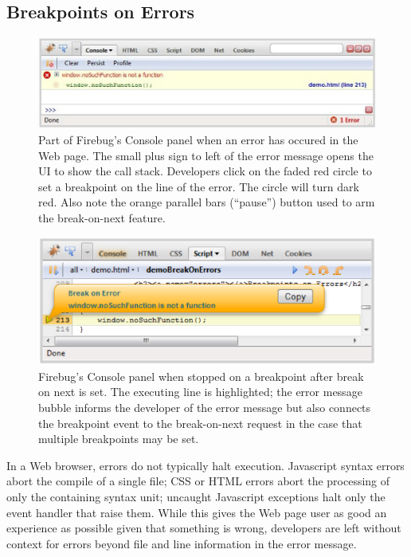 \documentclass{www2010-accepted}
\begin{document}
\subsection{Breakpoints on Errors}
\begin{figure}[htp]
\center
\includegraphics[scale=0.7]{error_in_console_set_break.eps}
\caption{Part of Firebug's Console panel when an error has occured in the Web
page. The small plus sign to left of the error message opens the UI to
show the call stack. Developers click on the faded red circle to set a
breakpoint on the line of the error. The circle will turn dark red.
Also note the orange parallel bars (``pause'') button used to arm the
break-on-next feature.}
\label{fig:net_set_XHR_BP.eps}
\end{figure}
\begin{figure}[htp]
\center
\includegraphics[scale=0.7]{console_hit_bon.eps}
\caption{Firebug's Console panel when stopped on a breakpoint after
break on next is set.  The executing line is highlighted; the error
message bubble informs the developer of the error message but also
connects the breakpoint event to the break-on-next request in the case
that multiple breakpoints may be set.}
\label{fig:console_hit_bon.eps}
\end{figure}

In a Web browser, errors do not typically halt execution. Javascript
syntax errors abort the compile of a single file; CSS or HTML errors
abort the processing of only the containing syntax unit; uncaught
Javascript exceptions halt only the event handler that raise
them. While this gives the Web page user as good an experience as
possible given that something is wrong, developers are left without
context for errors beyond file and line information in the error
message.
\end{document}
